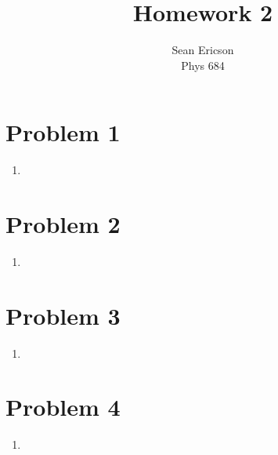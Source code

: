 \documentclass[12pt]{article}
\begin{document}
	
\title{Homework 2}
\author{Sean Ericson \\ Phys 684}
\maketitle

\section*{Problem 1}
\begin{enumerate}[label=(\alph*)]
    \item 
\end{enumerate}

\section*{Problem 2}
\begin{enumerate}[label=(\alph*)]
    \item 
\end{enumerate}

\section*{Problem 3}
\begin{enumerate}[label=(\alph*)]
    \item 
\end{enumerate}

\section*{Problem 4}
\begin{enumerate}[label=(\alph*)]
    \item 
\end{enumerate}
\end{document}
